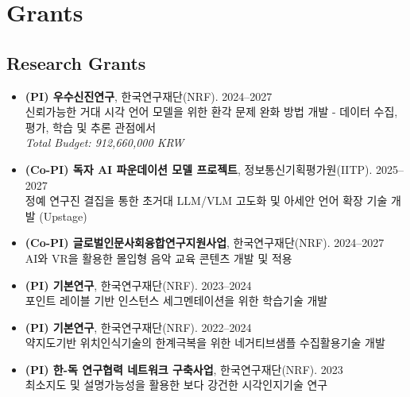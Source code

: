 \documentclass[letterpaper,11pt]{article}
\begin{document}
\vspace{.5em}
\section{Grants}

\subsection*{Research Grants}
\begin{itemize}[leftmargin=1.2em, itemsep=0.1em]
    \item \textbf{(PI) 우수신진연구}, 한국연구재단(NRF). \hfill 2024--2027 \\
    신뢰가능한 거대 시각 언어 모델을 위한 환각 문제 완화 방법 개발 - 데이터 수집, 평가, 학습 및 추론 관점에서 \\
    \textit{Total Budget: 912,660,000 KRW}

    \item \textbf{(Co-PI) 독자 AI 파운데이션 모델 프로젝트}, 정보통신기획평가원(IITP). \hfill 2025--2027 \\
    정예 연구진 결집을 통한 초거대 LLM/VLM 고도화 및 아세안 언어 확장 기술 개발 (Upstage)

    \item \textbf{(Co-PI) 글로벌인문사회융합연구지원사업}, 한국연구재단(NRF). \hfill 2024--2027 \\
    AI와 VR을 활용한 몰입형 음악 교육 콘텐츠 개발 및 적용

    \item \textbf{(PI) 기본연구}, 한국연구재단(NRF). \hfill 2023--2024 \\
    포인트 레이블 기반 인스턴스 세그멘테이션을 위한 학습기술 개발

    \item \textbf{(PI) 기본연구}, 한국연구재단(NRF). \hfill 2022--2024 \\
    약지도기반 위치인식기술의 한계극복을 위한 네거티브샘플 수집활용기술 개발

    \item \textbf{(PI) 한-독 연구협력 네트워크 구축사업}, 한국연구재단(NRF). \hfill 2023 \\
    최소지도 및 설명가능성을 활용한 보다 강건한 시각인지기술 연구
\end{itemize}
\end{document}
